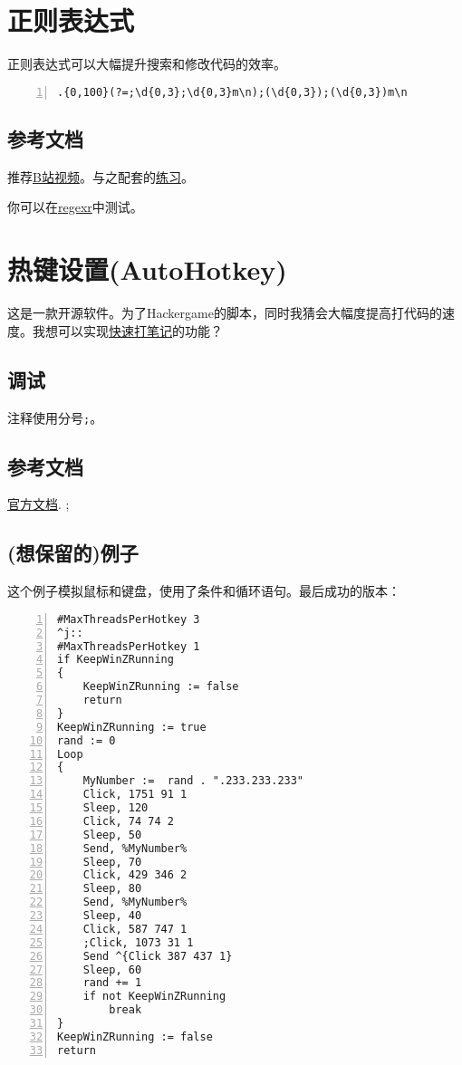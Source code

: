 \documentclass[11pt]{amsart}
\begin{document}
\section{正则表达式}
正则表达式可以大幅提升搜索和修改代码的效率。
\begin{lstlisting}[numbers=left,numberstyle=\tiny,numbersep=10pt]
.{0,100}(?=;\d{0,3};\d{0,3}m\n);(\d{0,3});(\d{0,3})m\n
\end{lstlisting}
\subsection{参考文档}
推荐\href{https://www.bilibili.com/video/BV19t4y1y7qP}{B站视频}。与之配套的\href{https://codejiaonang.com/#/course/regex_chapter1/}{练习}。

你可以在\href{https://regexr-cn.com/}{regexr}中测试。
\section{热键设置(AutoHotkey)}
这是一款开源软件。为了Hackergame的脚本，同时我猜会大幅度提高打代码的速度。我想可以实现\href{https://zhuanlan.zhihu.com/p/60049290}{快速打笔记}的功能？
\subsection{调试}

注释使用分号\lstinline|;|。

\subsection{参考文档}
\href{https://wyagd001.github.io/zh-cn/docs/AutoHotkey.htm}{官方文档}.
;
\subsection{(想保留的)例子}
这个例子模拟鼠标和键盘，使用了条件和循环语句。最后成功的版本：
\begin{lstlisting}[numbers=left,numberstyle=\tiny,numbersep=10pt]
#MaxThreadsPerHotkey 3
^j::  
#MaxThreadsPerHotkey 1
if KeepWinZRunning  
{
    KeepWinZRunning := false  
    return  
}
KeepWinZRunning := true
rand := 0
Loop
{
    MyNumber :=  rand . ".233.233.233"
	Click, 1751 91 1
	Sleep, 120
	Click, 74 74 2
	Sleep, 50	
	Send, %MyNumber%
	Sleep, 70	
	Click, 429 346 2
	Sleep, 80
	Send, %MyNumber%
	Sleep, 40
	Click, 587 747 1
	;Click, 1073 31 1
	Send ^{Click 387 437 1}
	Sleep, 60	
	rand += 1
    if not KeepWinZRunning  
        break  
}
KeepWinZRunning := false  
return
\end{lstlisting}
\end{document}

